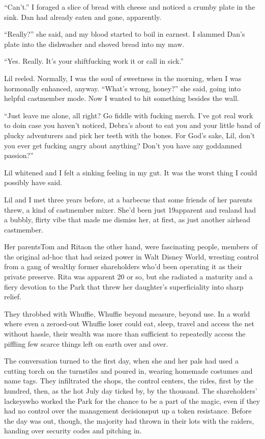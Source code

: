 “Can't.” I foraged a slice of bread with cheese and noticed a
crumby plate in the sink. Dan had already eaten and gone,
apparently.

“Really?” she said, and my blood started to boil in earnest. I
slammed Dan's plate into the dishwasher and shoved bread into my
maw.

“Yes. Really. It's your shift{\dash}fucking work it or call in sick.”

Lil reeled. Normally, I was the soul of sweetness in the morning,
when I was hormonally enhanced, anyway. “What's wrong, honey?” she
said, going into helpful castmember mode. Now I wanted to hit
something besides the wall.

“Just leave me alone, all right? Go fiddle with fucking merch. I've
got real work to do{\dash}in case you haven't noticed, Debra's about to
eat you and your little band of plucky adventurers and pick her
teeth with the bones. For God's sake, Lil, don't you ever get
fucking angry about anything? Don't you have any goddamned
passion?”

Lil whitened and I felt a sinking feeling in my gut. It was the
worst thing I could possibly have said.

Lil and I met three years before, at a barbecue that some friends
of her parents threw, a kind of castmember mixer. She'd been just
19{\dash}apparent and real{\dash}and had a bubbly, flirty vibe that made me
dismiss her, at first, as just another airhead castmember.

Her parents{\dash}Tom and Rita{\dash}on the other hand, were fascinating
people, members of the original ad-hoc that had seized power in
Walt Disney World, wresting control from a gang of wealthy former
shareholders who'd been operating it as their private preserve.
Rita was apparent 20 or so, but she radiated a maturity and a fiery
devotion to the Park that threw her daughter's superficiality into
sharp relief.

They throbbed with Whuffie, Whuffie beyond measure, beyond use. In
a world where even a zeroed-out Whuffie loser could eat, sleep,
travel and access the net without hassle, their wealth was more
than sufficient to repeatedly access the piffling few scarce things
left on earth over and over.

The conversation turned to the first day, when she and her pals had
used a cutting torch on the turnstiles and poured in, wearing
homemade costumes and name tags. They infiltrated the shops, the
control centers, the rides, first by the hundred, then, as the hot
July day ticked by, by the thousand. The shareholders' lackeys{\dash}who
worked the Park for the chance to be a part of the magic, even if
they had no control over the management decisions{\dash}put up a token
resistance. Before the day was out, though, the majority had thrown
in their lots with the raiders, handing over security codes and
pitching in.

